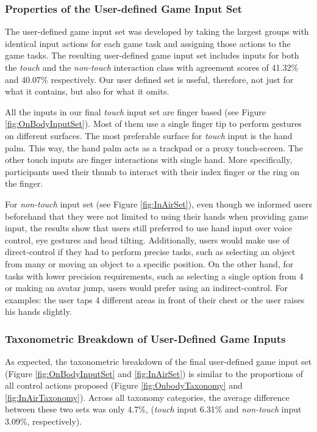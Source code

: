 \documentclass{sigchi}
\begin{document}
   \subsubsection{Properties of the User-defined Game Input Set}
   The user-defined game input set was developed by taking the largest groups with identical input actions for each game task and assigning those actions to the game tasks. 
   The resulting user-defined game input set includes inputs for both the \emph{touch} and the \emph{non-touch} interaction class with agreement scores of 41.32\% and 40.07\% respectively. Our user defined set is useful, therefore, not just for what it contains, but also for what it omits.

      All the inputs in our final \emph{touch} input set are finger based (see Figure \ref{fig:OnBodyInputSet}). Most of them use a single finger tip to perform gestures on different surfaces. The most preferable surface for \emph{touch} input is the hand palm. This way, the hand palm acts as a trackpad or a proxy touch-screen. The other touch inputs are finger interactions with single hand. More specifically, participants used their thumb to interact with their index finger or the ring on the finger.

   For \emph{non-touch} input set (see Figure \ref{fig:InAirSet}), even though we informed users beforehand that they were not limited to using their hands when providing game input, the results show that users still preferred to use hand input over voice control, eye gestures and head tilting. Additionally, users would make use of direct-control if they had to perform precise tasks, such as selecting an object from many or moving an object to a specific position. On the other hand, for tasks with lower precision requirements, such as selecting a single option from 4 or making an avatar jump, users would prefer using an indirect-control. For examples: the user taps 4 different areas in front of their chest or the user raises his hands slightly.


 

   \subsubsection{Taxonometric Breakdown of User-Defined Game Inputs}
   As expected, the taxonometric breakdown of the final user-defined game input set (Figure \ref{fig:OnBodyInputSet} and \ref{fig:InAirSet}) is similar to the proportions of all control actions proposed (Figure \ref{fig:OnbodyTaxonomy} and \ref{fig:InAirTaxonomy}). Across all taxonomy categories, the average difference between these two sets was only 4.7\%, (\emph{touch} input 6.31\% and \emph{non-touch} input 3.09\%, respectively).
\end{document}
